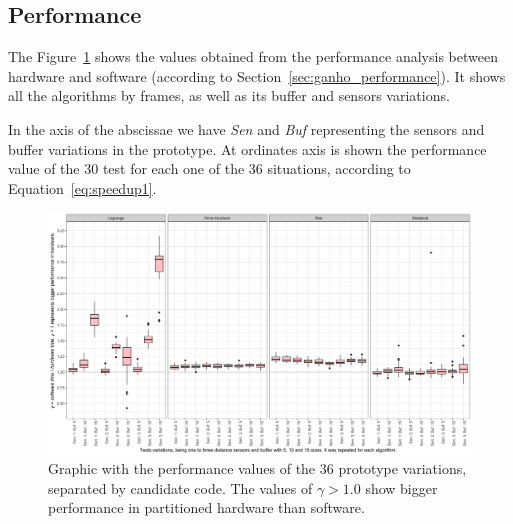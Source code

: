            

    \subsection{Performance}
    
        The Figure~\ref{fig:performance} shows the values obtained from the performance analysis between hardware and software (according to Section~\ref{sec:ganho_performance}).
        It shows all the algorithms by frames, as well as its buffer and sensors variations.
        
        In the axis of the abscissae we have \textit{Sen} and \textit{Buf} representing the sensors and buffer variations in the prototype.
        At ordinates axis is shown the performance value of the 30 test for each one of the 36 situations, according to Equation~\ref{eq:speedup1}.
        
        \begin{figure}[h] \centering
            \vspace{-0.5em}
            \includegraphics[width=1\textwidth]{img/performance.png}
            \caption{Graphic with the performance values of the 36 prototype variations, separated by candidate code. The values of $ \gamma > 1.0 $ show bigger performance in partitioned hardware than software.}
            
            \label{fig:performance}
        \end{figure}
   
